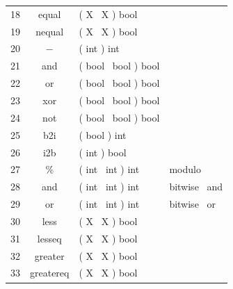 \begin{center}
\begin{supertabular}{||l||c|l|l||}
18              & equal         &( X ~X ) bool  & \\
19              & nequal        &( X~ X ) bool  & \\
20              & $-$           &( int ) int    & \\
21              & and           &( bool ~bool ) bool    & \\
22              & or            &( bool ~bool ) bool    & \\
23              & xor           &( bool ~bool ) bool    & \\
24              & not           &( bool ~bool ) bool    & \\
25              & b2i           &( bool ) int   & \\
26              & i2b           &( int ) bool   & \\
27              & \%            &( int ~int ) int       & modulo \\
28              & and           &( int ~int ) int       & bitwise ~and\\
29              & or            &( int ~int ) int       & bitwise ~or\\
30              & less          &( X ~X ) bool  & \\
31              & lesseq        &( X ~X ) bool  & \\
32              & greater       &( X ~X ) bool  & \\
33              & greatereq     &( X ~X ) bool  & \\

\end{supertabular}
\end{center}

